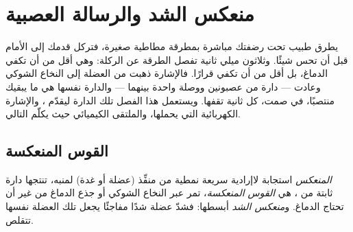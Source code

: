 \chapter{منعكس الشد والرسالة العصبية}\label{ch:g12:stretch-reflex}

يطرق طبيب  تحت رضفتك مباشرة بمطرقة مطاطية صغيرة، فتركل قدمك إلى
الأمام قبل أن تحس شيئًا. وثلاثون ميلي ثانية تفصل الطرقة عن الركلة: وهي
أقل من أن تكفي الدماغ، بل أقل من أن تكفي قرارًا. فالإشارة ذهبت من
العضلة إلى النخاع الشوكي وعادت --- دارة من عصبونين ووصلة واحدة بينهما
--- والدارة نفسها هي ما يبقيك منتصبًا، في صمت، كل ثانية تقفها. ويستعمل
هذا الفصل تلك الدارة ليقدّم ، والإشارة الكهربائية التي يحملها،
والملتقى الكيميائي حيث يكلّم   التالي.

\section{القوس المنعكسة}

\begin{definition}[المنعكس]\label{def:g12:stretch-reflex:reflex}
\emph{المنعكس} استجابة لاإرادية سريعة نمطية من منفِّذ
(عضلة أو غدة) لمنبه، تنتجها دارة ثابتة من ، هي \emph{القوس
المنعكسة}، تمر عبر النخاع الشوكي أو جذع الدماغ من
غير أن تحتاج الدماغ. و\emph{منعكس الشد} أبسطها: فشدّ
عضلة شدًا مفاجئًا يجعل تلك العضلة نفسها تتقلص.
\end{definition}

